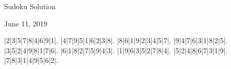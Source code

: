 \documentclass{article}
\begin{document}
\begin{center}
\Huge{Sudoku Solution}
\end{center}
\begin{center}
\Large{June 11, 2019}
\end{center}
\begin{sudoku}
|2|3|5|7|8|4|6|9|1|.
|4|7|9|5|1|6|2|3|8|.
|8|6|1|9|2|3|4|5|7|.
|9|4|7|6|3|1|8|2|5|.
|3|5|2|4|9|8|1|7|6|.
|6|1|8|2|7|5|9|4|3|.
|1|9|6|3|5|2|7|8|4|.
|5|2|4|8|6|7|3|1|9|.
|7|8|3|1|4|9|5|6|2|.
\end{sudoku}
\end{document}
